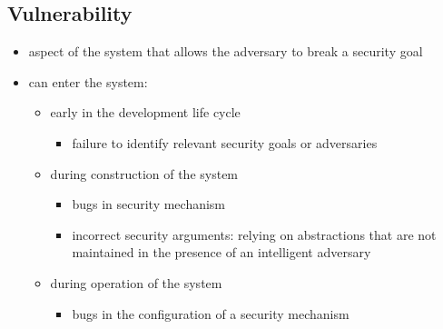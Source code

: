 \documentclass[12pt,titlepage,a4paper]{report}
\begin{document}
			\subsection{Vulnerability}
				\begin{itemize}
					\item aspect of the system that allows the adversary to break a security goal
					\item can enter the system:
					\begin{itemize}
						\samepage
						\item early in the development life cycle
						\begin{itemize}
							\item failure to identify relevant security goals or adversaries
						\end{itemize}
						\item during construction of the system
						\begin{itemize}
							\item bugs in security mechanism
							\item incorrect security arguments: relying on abstractions that are not maintained in the presence of an intelligent adversary
						\end{itemize}
						\item during operation of the system
						\begin{itemize}
							\item bugs in the configuration of a security mechanism
						\end{itemize}
					\end{itemize}
				\end{itemize}
\end{document}
